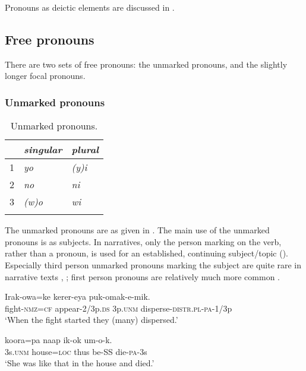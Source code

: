 Pronouns as deictic elements are discussed in .

\subsection{Free pronouns}
{}
There are two sets of free pronouns: the unmarked pronouns, and the slightly longer focal pronouns.

\subsubsection{Unmarked pronouns}\label{sec:3.5.2.1}
{}

\begin{table}[h]
 \caption{Unmarked pronouns.}
\label{tab:3:unmarkedpronouns}

\begin{tabular}{l>{\itshape}l>{\itshape}l}
\mytoprule
 &\upshape singular &\upshape plural\\
\midrule
1 &yo &(y)i\\
2 &no &ni\\
3 &(w)o &wi\\
\mybottomrule 
\end{tabular}
\end{table}

The unmarked pronouns are as given in .
The main use of the unmarked pronouns is as subjects. In narratives, only the person marking on the verb, rather than a pronoun, is used for an established, continuing subject/topic (). Especially third person unmarked pronouns marking the subject are quite rare in narrative texts , ; first person pronouns are relatively much more common  \citep[79--80]{Jarvinen1991}. 

 
\ea%
\label{ex:3:x533}
\gll Irak-owa=ke kerer-eya   puk-omak-e-mik.\\
fight-\textsc{nmz}=\textsc{cf} appear-2/3p.\textsc{ds} 3p.\textsc{unm} disperse-\textsc{distr}.\textsc{pl}-\textsc{pa}-1/3p\\
\glt`When the fight started they (many) dispersed.'
\z

\ea%
\label{ex:3:x534}
\gll {} koora=pa naap ik-ok um-o-k. \\
3s.\textsc{unm} house=\textsc{loc} thus be-SS die-\textsc{pa}-3s\\
\glt`She was like that in the house and died.'
\z

